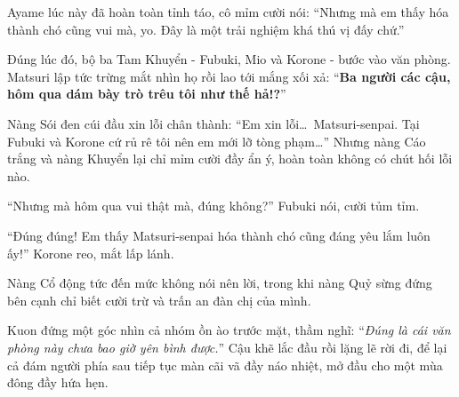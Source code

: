 \documentclass[../main.tex]{subfiles}
\begin{document}
Ayame lúc này đã hoàn toàn tỉnh táo, cô mỉm cười nói: ``Nhưng mà em thấy hóa thành chó cũng vui mà, yo. Đây là một trải nghiệm khá thú vị đấy chứ.''

Đúng lúc đó, bộ ba Tam Khuyển - Fubuki, Mio và Korone - bước vào văn phòng. Matsuri lập tức trừng mắt nhìn họ rồi lao tới mắng xối xả: ``\textbf{Ba người các cậu, hôm qua dám bày trò trêu tôi như thế hả!?}''

Nàng Sói đen cúi đầu xin lỗi chân thành: ``Em xin lỗi\dots\ Matsuri-senpai. Tại Fubuki và Korone cứ rủ rê tôi nên em mới lỡ tòng phạm\dots'' Nhưng nàng Cáo trắng và nàng Khuyển lại chỉ mỉm cười đầy ẩn ý, hoàn toàn không có chút hối lỗi nào.

``Nhưng mà hôm qua vui thật mà, đúng không?'' Fubuki nói, cười tủm tỉm.

``Đúng đúng! Em thấy Matsuri-senpai hóa thành chó cũng đáng yêu lắm luôn ấy!'' Korone reo, mắt lấp lánh.

Nàng Cổ động tức đến mức không nói nên lời, trong khi nàng Quỷ sừng đứng bên cạnh chỉ biết cười trừ và trấn an đàn chị của mình.

Kuon đứng một góc nhìn cả nhóm ồn ào trước mặt, thầm nghĩ: ``\textit{Đúng là cái văn phòng này chưa bao giờ yên bình được.}'' Cậu khẽ lắc đầu rồi lặng lẽ rời đi, để lại cả đám người phía sau tiếp tục màn cãi vã đầy náo nhiệt, mở đầu cho một mùa đông đầy hứa hẹn.
\end{document}
